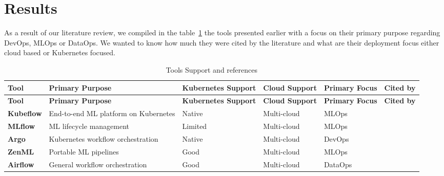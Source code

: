 \section{Results}\label{sec:stresults}

As a result of our literature review, we compiled in the table~\ref{tab:tools} the tools presented earlier with a focus on their primary purpose regarding DevOps, MLOps or DataOps.
We wanted to know how much they were cited by the literature
and what are their deployment focus either cloud based or Kubernetes focused.

\footnotesize
\begin{longtable}{|p{2cm}|p{3.5cm}|p{2cm}|p{2cm}|p{1.5cm}|p{1.5cm}|}
    \caption{Tools Support and references} \label{tab:tools}
    \hline
    \textbf{Tool} & \textbf{Primary Purpose} & \textbf{Kubernetes Support} & \textbf{Cloud Support} & \textbf{Primary Focus} & \textbf{Cited by} \\
    \hline
    \endfirsthead

    \hline
    \textbf{Tool} & \textbf{Primary Purpose} & \textbf{Kubernetes Support} & \textbf{Cloud Support} & \textbf{Primary Focus} & \textbf{Cited by} \\
    \hline
    \endhead

    \hline
    \endfoot

    \hline
    \endlastfoot

    \textbf{Kubeflow} & End-to-end ML platform on Kubernetes & Native & Multi-cloud & MLOps & \cite{FANNOUCH2025100321,Kreuzberger2022MachineLO,9792270,inproceedings, mlops-definition-tools-and-challenge} \\
    \hline

    \textbf{MLflow} & ML lifecycle management & Limited & Multi-cloud & MLOps & \cite{mlflow,Haakman2021,Kreuzberger2022MachineLO,BURGUENOROMERO2025107499,inproceedings} \\
    \hline

    \textbf{Argo} & Kubernetes workflow orchestration & Native & Multi-cloud & DevOps & \cite{inproceedings} \\
    \hline

    \textbf{ZenML} & Portable ML pipelines & Good & Multi-cloud & MLOps & \cite{} \\
    \hline

    \textbf{Airflow} & General workflow orchestration & Good & Multi-cloud & DataOps & \cite{mlflow,Kreuzberger2022MachineLO,BURGUENOROMERO2025107499} \\
    \hline


\end{longtable}
